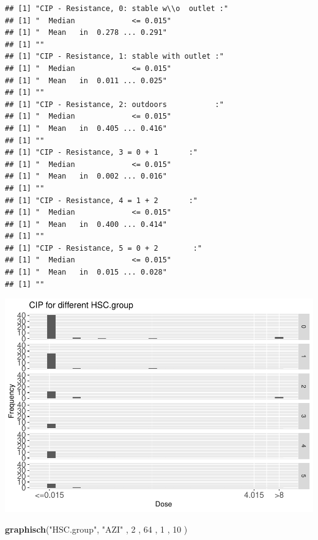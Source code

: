 \documentclass[
]{article}
\newenvironment{Shaded}{\begin{snugshade}}{\end{snugshade}}
\newcommand{\DecValTok}[1]{\textcolor[rgb]{0.00,0.00,0.81}{#1}}
\newcommand{\KeywordTok}[1]{\textcolor[rgb]{0.13,0.29,0.53}{\textbf{#1}}}
\newcommand{\NormalTok}[1]{#1}
\newcommand{\StringTok}[1]{\textcolor[rgb]{0.31,0.60,0.02}{#1}}
\begin{document}
\begin{verbatim}
## [1] "CIP - Resistance, 0: stable w\\o  outlet :"
## [1] "  Median             <= 0.015"
## [1] "  Mean   in  0.278 ... 0.291"
## [1] ""
## [1] "CIP - Resistance, 1: stable with outlet :"
## [1] "  Median             <= 0.015"
## [1] "  Mean   in  0.011 ... 0.025"
## [1] ""
## [1] "CIP - Resistance, 2: outdoors           :"
## [1] "  Median             <= 0.015"
## [1] "  Mean   in  0.405 ... 0.416"
## [1] ""
## [1] "CIP - Resistance, 3 = 0 + 1       :"
## [1] "  Median             <= 0.015"
## [1] "  Mean   in  0.002 ... 0.016"
## [1] ""
## [1] "CIP - Resistance, 4 = 1 + 2       :"
## [1] "  Median             <= 0.015"
## [1] "  Mean   in  0.400 ... 0.414"
## [1] ""
## [1] "CIP - Resistance, 5 = 0 + 2        :"
## [1] "  Median             <= 0.015"
## [1] "  Mean   in  0.015 ... 0.028"
## [1] ""
\end{verbatim}

\includegraphics{Verteilungen_files/figure-latex/unnamed-chunk-46-1.pdf}

\begin{Shaded}
\begin{Highlighting}[]
   \KeywordTok{graphisch}\NormalTok{(}\StringTok{"HSC.group"}\NormalTok{, }\StringTok{"AZI"}\NormalTok{ , }\DecValTok{2}\NormalTok{    ,  }\DecValTok{64}\NormalTok{   ,   }\DecValTok{1}\NormalTok{    ,   }\DecValTok{10}\NormalTok{    )}
\end{Highlighting}
\end{Shaded}
\end{document}
